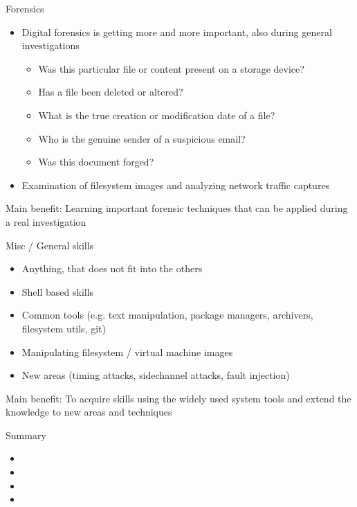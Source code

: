 \documentclass[12 pt]{beamer}
\begin{document}
\begin{frame}{Forensics}

  \begin{itemize}
    \item{Digital forensics is getting more and more important, also during general investigations}
      \begin{itemize}
        \item{Was this particular file or content present on a storage
          device?}
        \item{Has a file been deleted or altered?}
        \item{What is the true creation or modification date of a file?}
        \item{Who is the genuine sender of a suspicious email?}
        \item{Was this document forged?}
      \end{itemize}
    \item{Examination of filesystem images and analyzing network traffic captures}
  \end{itemize}

  \begin{exampleblock}{}
    Main benefit: Learning important forensic techniques that can be applied during a real investigation
  \end{exampleblock}

\end{frame}

\begin{frame}{Misc / General skills}

  \begin{itemize}
    \item{Anything, that does not fit into the others}
    \item{Shell based skills}
    \item{Common tools (e.g. text manipulation, package managers, archivers, filesystem utils, git)}
    \item{Manipulating filesystem / virtual machine images}
    \item{New areas (timing attacks, sidechannel attacks, fault injection)}
  \end{itemize}

  \begin{exampleblock}{}
    Main benefit: To acquire skills using the widely used system tools and extend the knowledge to new areas and techniques
  \end{exampleblock}

\end{frame}


\begin{frame}{Summary}

  \begin{itemize}
    \item{}
    \item{}
    \item{}
    \item{}
  \end{itemize}

\end{frame}

\end{document}
